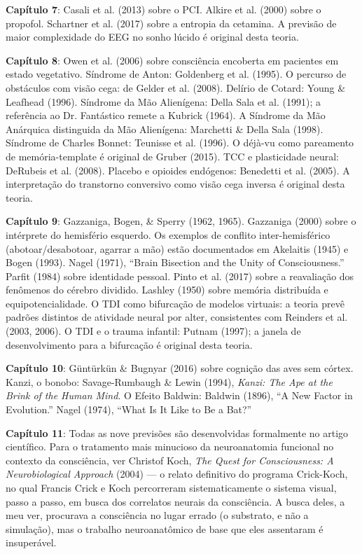 \documentclass[11pt, twoside, openright]{book}
\begin{document}
\textbf{Capítulo 7}: Casali et al. (2013) sobre o PCI. Alkire et al. (2000) sobre o propofol. Schartner et al. (2017) sobre a entropia da cetamina. A previsão de maior complexidade do EEG no sonho lúcido é original desta teoria.

\textbf{Capítulo 8}: Owen et al. (2006) sobre consciência encoberta em pacientes em estado vegetativo. Síndrome de Anton: Goldenberg et al. (1995). O percurso de obstáculos com visão cega: de Gelder et al. (2008). Delírio de Cotard: Young \& Leafhead (1996). Síndrome da Mão Alienígena: Della Sala et al. (1991); a referência ao Dr. Fantástico remete a Kubrick (1964). A Síndrome da Mão Anárquica distinguida da Mão Alienígena: Marchetti \& Della Sala (1998). Síndrome de Charles Bonnet: Teunisse et al. (1996). O déjà-vu como pareamento de memória-template é original de Gruber (2015). TCC e plasticidade neural: DeRubeis et al. (2008). Placebo e opioides endógenos: Benedetti et al. (2005). A interpretação do transtorno conversivo como visão cega inversa é original desta teoria.

\textbf{Capítulo 9}: Gazzaniga, Bogen, \& Sperry (1962, 1965). Gazzaniga (2000) sobre o intérprete do hemisfério esquerdo. Os exemplos de conflito inter-hemisférico (abotoar/\allowbreak{}desabotoar, agarrar a mão) estão documentados em Akelaitis (1945) e Bogen (1993). Nagel (1971), ``Brain Bisection and the Unity of Consciousness.'' Parfit (1984) sobre identidade pessoal. Pinto et al. (2017) sobre a reavaliação dos fenômenos do cérebro dividido. Lashley (1950) sobre memória distribuída e equipotencialidade. O TDI como bifurcação de modelos virtuais: a teoria prevê padrões distintos de atividade neural por alter, consistentes com Reinders et al. (2003, 2006). O TDI e o trauma infantil: Putnam (1997); a janela de desenvolvimento para a bifurcação é original desta teoria.

\textbf{Capítulo 10}: Güntürkün \& Bugnyar (2016) sobre cognição das aves sem córtex. Kanzi, o bonobo: Savage-Rumbaugh \& Lewin (1994), \textit{Kanzi: The Ape at the Brink of the Human Mind}. O Efeito Baldwin: Baldwin (1896), ``A New Factor in Evolution.'' Nagel (1974), ``What Is It Like to Be a Bat?''

\textbf{Capítulo 11}: Todas as nove previsões são desenvolvidas formalmente no artigo científico. Para o tratamento mais minucioso da neuroanatomia funcional no contexto da consciência, ver Christof Koch, \textit{The Quest for Consciousness: A Neurobiological Approach} (2004) --- o relato definitivo do programa Crick-Koch, no qual Francis Crick e Koch percorreram sistematicamente o sistema visual, passo a passo, em busca dos correlatos neurais da consciência. A busca deles, a meu ver, procurava a consciência no lugar errado (o substrato, e não a simulação), mas o trabalho neuroanatômico de base que eles assentaram é insuperável.
\end{document}

